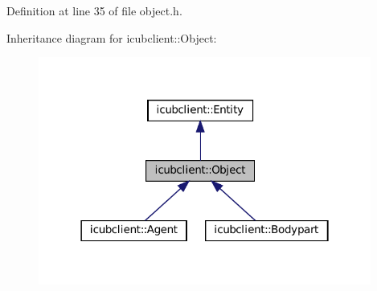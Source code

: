 Definition at line 35 of file object.\+h.



Inheritance diagram for icubclient\+:\+:Object\+:
\nopagebreak
\begin{figure}[H]
\begin{center}
\leavevmode
\includegraphics[width=310pt]{classicubclient_1_1Object__inherit__graph}
\end{center}
\end{figure}
